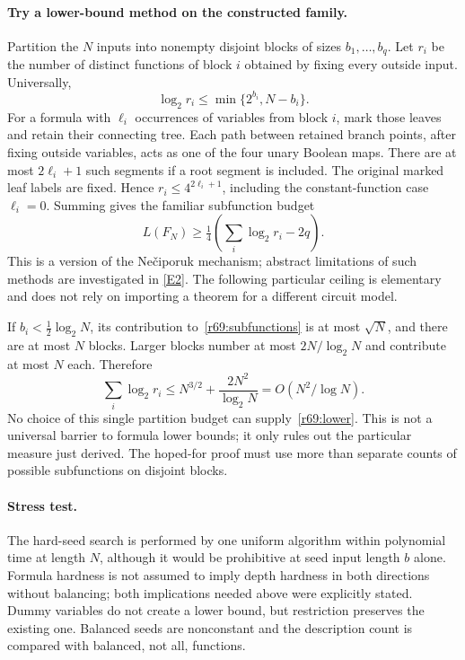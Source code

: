 \documentclass[11pt,a4paper]{article}
\newcommand{\eref}[2]{\hyperlink{extra:#1:#2}{[E#2]}}
\numberwithin{equation}{section}
\begin{document}
\paragraph{Try a lower-bound method on the constructed family.}
Partition the $N$ inputs into nonempty disjoint blocks of sizes $b_1,\ldots,b_q$. Let $r_i$ be the number of distinct functions of block $i$ obtained by fixing every outside input. Universally,
\begin{equation}\label{r69:subfunctions}
 \log_2r_i\le\min\{2^{b_i},N-b_i\}.
\end{equation}
For a formula with $\ell_i$ occurrences of variables from block $i$, mark those leaves and retain their connecting tree. Each path between retained branch points, after fixing outside variables, acts as one of the four unary Boolean maps. There are at most $2\ell_i+1$ such segments if a root segment is included. The original marked leaf labels are fixed. Hence $r_i\le4^{2\ell_i+1}$, including the constant-function case $\ell_i=0$. Summing gives the familiar subfunction budget
\[
 L(F_N)\ge\tfrac14\left(\sum_i\log_2r_i-2q\right).
\]
This is a version of the Nečiporuk mechanism; abstract limitations of such methods are investigated in \eref{69}{2}. The following particular ceiling is elementary and does not rely on importing a theorem for a different circuit model.

If $b_i<\frac12\log_2N$, its contribution to~\eqref{r69:subfunctions} is at most $\sqrt N$, and there are at most $N$ blocks. Larger blocks number at most $2N/\log_2N$ and contribute at most $N$ each. Therefore
\[
 \sum_i\log_2r_i\le N^{3/2}+\frac{2N^2}{\log_2N}
       =O(N^2/\log N).
\]
No choice of this single partition budget can supply~\eqref{r69:lower}. This is not a universal barrier to formula lower bounds; it only rules out the particular measure just derived. The hoped-for proof must use more than separate counts of possible subfunctions on disjoint blocks.

\paragraph{Stress test.}
The hard-seed search is performed by one uniform algorithm within polynomial time at length $N$, although it would be prohibitive at seed input length $b$ alone. Formula hardness is not assumed to imply depth hardness in both directions without balancing; both implications needed above were explicitly stated. Dummy variables do not create a lower bound, but restriction preserves the existing one. Balanced seeds are nonconstant and the description count is compared with balanced, not all, functions.
\end{document}
